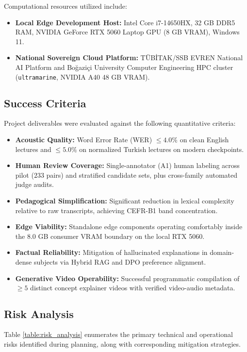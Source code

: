 \documentclass[a4paper,12pt]{report}
\begin{document}
Computational resources utilized include:
\begin{itemize}
    \item \textbf{Local Edge Development Host:} Intel Core i7-14650HX, 32 GB DDR5 RAM, NVIDIA GeForce RTX 5060 Laptop GPU (8 GB VRAM), Windows 11.
    \item \textbf{National Sovereign Cloud Platform:} TÜBİTAK/SSB EVREN National AI Platform and Bo\u{g}azi\c{c}i University Computer Engineering HPC cluster (\texttt{ultramarine}, NVIDIA A40 48 GB VRAM).
\end{itemize}

\subsection{Success Criteria}
Project deliverables were evaluated against the following quantitative criteria:
\begin{itemize}
    \item \textbf{Acoustic Quality:} Word Error Rate (WER) $\le 4.0\%$ on clean English lectures and $\le 5.0\%$ on normalized Turkish lectures on modern checkpoints.
    \item \textbf{Human Review Coverage:} Single-annotator (A1) human labeling across pilot ($233$ pairs) and stratified candidate sets, plus cross-family automated judge audits.
    \item \textbf{Pedagogical Simplification:} Significant reduction in lexical complexity relative to raw transcripts, achieving CEFR-B1 band concentration.
    \item \textbf{Edge Viability:} Standalone edge components operating comfortably inside the 8.0 GB consumer VRAM boundary on the local RTX 5060.
    \item \textbf{Factual Reliability:} Mitigation of hallucinated explanations in domain-dense subjects via Hybrid RAG and DPO preference alignment.
    \item \textbf{Generative Video Operability:} Successful programmatic compilation of $\ge 5$ distinct concept explainer videos with verified video-audio metadata.
\end{itemize}

\subsection{Risk Analysis}
Table \ref{table:risk_analysis} enumerates the primary technical and operational risks identified during planning, along with corresponding mitigation strategies.
\end{document}
